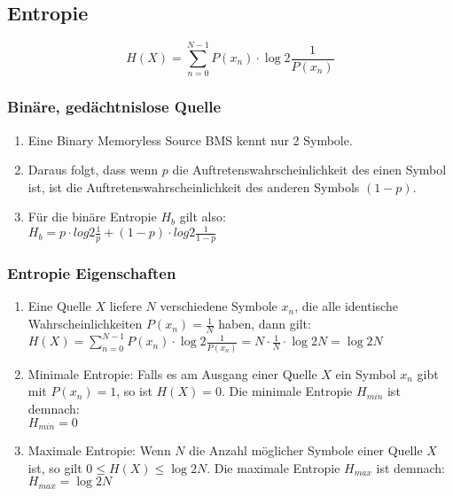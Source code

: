 \subsection{Entropie}%
\label{sub:entropie}
\begin{equation*}
	H(X) = \sum^{N-1}_{n=0} P(x_n) \cdot \log{2}{\frac{1}{P(x_n)}} 
\end{equation*}

\subsubsection{Binäre, gedächtnislose Quelle}%
\label{ssub:binäre_gedächtnislose_quelle}
\begin{enumerate}
	\item Eine Binary Memoryless Source BMS kennt nur 2 Symbole.
	\item Daraus folgt, dass wenn $p$ die Auftretenswahrscheinlichkeit des einen Symbol ist, ist die
		Auftretenswahrscheinlichkeit des anderen Symbols $(1-p)$.
	\item Für die binäre Entropie $H_b$ gilt also: \\
		$H_b = p \cdot log{2}{\frac{1}{p}} + (1-p) \cdot log{2}{\frac{1}{1-p}}$
\end{enumerate}

\subsubsection{Entropie Eigenschaften}
\begin{enumerate}
	\item Eine Quelle $X$ liefere $N$ verschiedene Symbole $x_n$, die alle identische Wahrscheinlichkeiten
		$P(x_n)=\frac{1}{N}$ haben, dann gilt: \\
		$H(X)=\sum^{N-1}_{n=0}P(x_n) \cdot \log{2}{\frac{1}{P(x_n)}} = N \cdot \frac{1}{N} \cdot
		\log{2}{N} = \log{2}{N}$
	\item Minimale Entropie: Falls es am Ausgang einer Quelle $X$ ein Symbol $x_n$ gibt mit $P(x_n) = 1$, 
		so ist $H(X)=0$. Die minimale Entropie $H_{min}$ ist demnach: \\
		$H_{min} = 0$
	\item Maximale Entropie: Wenn $N$ die Anzahl möglicher Symbole einer Quelle $X$ ist, so gilt $0\leq H
		(X) \leq \log{2}{N}$. Die maximale Entropie $H_{max}$ ist demnach: \\
		$H_{max} = \log{2}{N}$
\end{enumerate}
